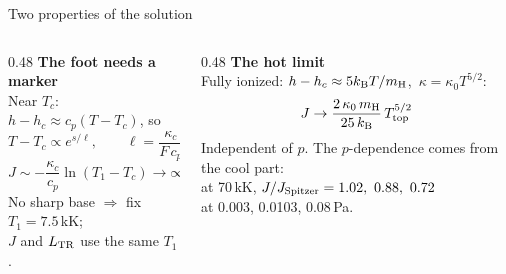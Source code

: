 \documentclass[aspectratio=169,10pt]{beamer}
\newcommand{\Ttop}{T_{\rm top}}
\newcommand{\LTR}{L_{\rm TR}}
\newcommand{\kB}{k_{\rm B}}
\newcommand{\mH}{m_{\rm H}}
\begin{document}
\begin{frame}{Two properties of the solution}
  \begin{columns}[T]
    \begin{column}{0.48\textwidth}
      \textbf{The foot needs a marker}\\[4pt]
      Near $T_c$: $h - h_c \approx c_p(T - T_c)$, so
      \[
        T - T_c \propto e^{s/\ell},\qquad \ell = \frac{\kappa_c}{F\,c_p}
      \]
      \[
        J \sim -\frac{\kappa_c}{c_p}\ln(T_1 - T_c) \to \infty
      \]
      \small No sharp base $\Rightarrow$ fix $T_1 = 7.5$\,kK;\\
      $J$ and $\LTR$ use the same $T_1$.
    \end{column}
    \begin{column}{0.48\textwidth}
      \textbf{The hot limit}\\[4pt]
      Fully ionized: $h - h_c \approx 5\kB T/\mH$,\ $\kappa = \kappa_0T^{5/2}$:
      \[
        J \to \frac{2\,\kappa_0\,\mH}{25\,\kB}\,\Ttop^{5/2}
      \]
      \small Independent of $p$. The $p$-dependence comes from the cool part:\\
      at 70\,kK, $J/J_{\rm Spitzer} = 1.02,\ 0.88,\ 0.72$\\
      at 0.003, 0.0103, 0.08\,Pa.
    \end{column}
  \end{columns}
\end{frame}
\end{document}
